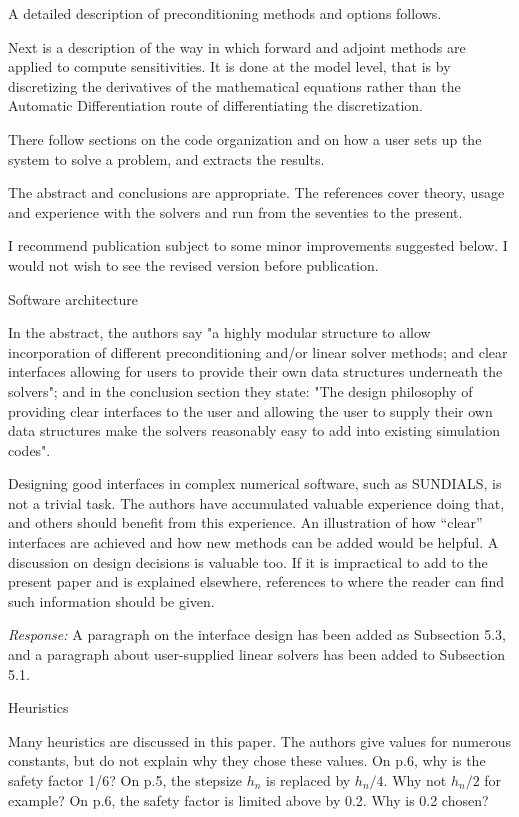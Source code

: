 \documentclass[12pt]{letter}
\begin{document}
A detailed description of preconditioning methods and options follows.

Next is a description of the way in which forward and adjoint methods
are applied to compute sensitivities. It is done at the model level,
that is by discretizing the derivatives of the mathematical equations
rather than the Automatic Differentiation route of differentiating the
discretization.

There follow sections on the code organization and on how a user sets
up the system to solve a problem, and extracts the results.

The abstract and conclusions are appropriate. The references cover
theory, usage and experience with the solvers and run from the
seventies to the present.

I recommend publication subject to some minor improvements suggested
below.  I would not wish to see the revised version before publication.


Software architecture

In the abstract, the authors say "a highly modular structure to allow
incorporation of different preconditioning and/or linear solver
methods; and clear interfaces allowing for users to provide their own
data structures underneath the solvers"; and in the conclusion section
they state: "The design philosophy of providing clear interfaces to
the user and allowing the user to supply their own data structures
make the solvers reasonably easy to add into existing simulation
codes".

Designing good interfaces in complex numerical software, such as
SUNDIALS, is not a trivial task. The authors have accumulated
valuable experience doing that, and others should benefit from
this experience. An illustration of how ``clear'' interfaces are
achieved and how new methods can be added would be helpful.  A
discussion on design decisions is valuable too. If it is
impractical to add to the present paper and is explained
elsewhere, references to where the reader can find such
information should be given.

{\em Response:} A paragraph on the interface design has been added as
Subsection 5.3, and a paragraph about user-supplied linear solvers
has been added to Subsection 5.1.


Heuristics

Many heuristics are discussed in this paper. The authors give values
for numerous constants, but do not explain why they chose these
values.  On p.6, why is the safety factor 1/6? On p.5, the stepsize
$h_n$ is replaced by $h_n/4$. Why not $h_n/2$ for example? On p.6, the
safety factor is limited above by 0.2. Why is 0.2 chosen?
\end{document}
